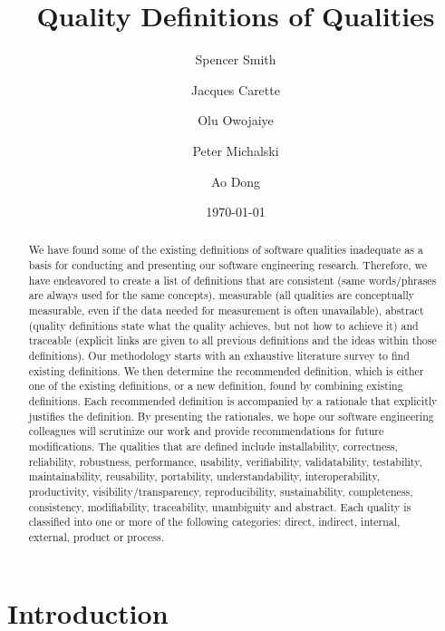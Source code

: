 \documentclass[letterpaper, cleveref]{lipics-v2019}
\title{Quality Definitions of Qualities}
\author{Spencer Smith}{McMaster University, Canada}{smiths@mcmaster.ca}{}{}
\author{Jacques Carette}{McMaster University, Canada}{carette@mcmaster.ca}{}{}
\author{Olu Owojaiye}{McMaster University, Canada}{owojaiyo@mcmaster.ca}{}{}
\author{Peter Michalski}{McMaster University, Canada}{michap@mcmaster.ca}{}{}
\author{Ao Dong}{McMaster University, Canada}{donga9@mcmaster.ca}{}{}
\date{\today}
\theoremstyle{definition}
\begin{document}
\maketitle

\begin{abstract}
	We have found some of the existing definitions of software qualities
	inadequate as a basis for conducting and presenting our software engineering
	research.  Therefore, we have endeavored to create a list of definitions that
	are consistent (same words/phrases are always used for the same concepts),
	measurable (all qualities are conceptually measurable, even if the data needed
	for measurement is often unavailable), abstract (quality definitions state
	what the quality achieves, but not how to achieve it) and traceable (explicit
	links are given to all previous definitions and the ideas within those
	definitions).  Our methodology starts with an exhaustive literature survey to
	find existing definitions.  We then determine the recommended definition,
	which is either one of the existing definitions, or a new definition, found by
	combining existing definitions.  Each recommended definition is accompanied by
	a rationale that explicitly justifies the definition.  By presenting the
	rationales, we hope our software engineering colleagues will scrutinize our
	work and provide recommendations for future modifications. The qualities that
	are defined include installability, correctness, reliability, robustness,
	performance, usability, verifiability, validatability, testability,
	maintainability, reusability, portability, understandability,
	interoperability, productivity, visibility/transparency, reproducibility,
	sustainability, completeness, consistency, modifiability, traceability,
	unambiguity and abstract.  Each quality is classified into one or more of the
	following categories: direct, indirect, internal, external, product or
	process.
\end{abstract}

\newpage

\tableofcontents

\newpage

\section{Introduction} \label{SecIntroduction}
\end{document}
